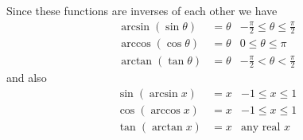 Since these functions are inverses of each other we have
\begin{align*}
  \arcsin(\sin \theta) &= \theta & -\frac{\pi}{2} \leq \theta \leq \frac{\pi}{2} \\
  \arccos(\cos \theta) &= \theta & 0 \leq \theta \leq \pi \\
  \arctan(\tan \theta) &= \theta & -\frac{\pi}{2} < \theta < \frac{\pi}{2}	
\end{align*}
and also
\begin{align*}
  \sin(\arcsin x) &= x & -1 \leq x \leq 1 \\
  \cos(\arccos x) &= x & -1 \leq x \leq 1 \\
  \tan(\arctan x) &= x & \text{any real $x$}
\end{align*}

